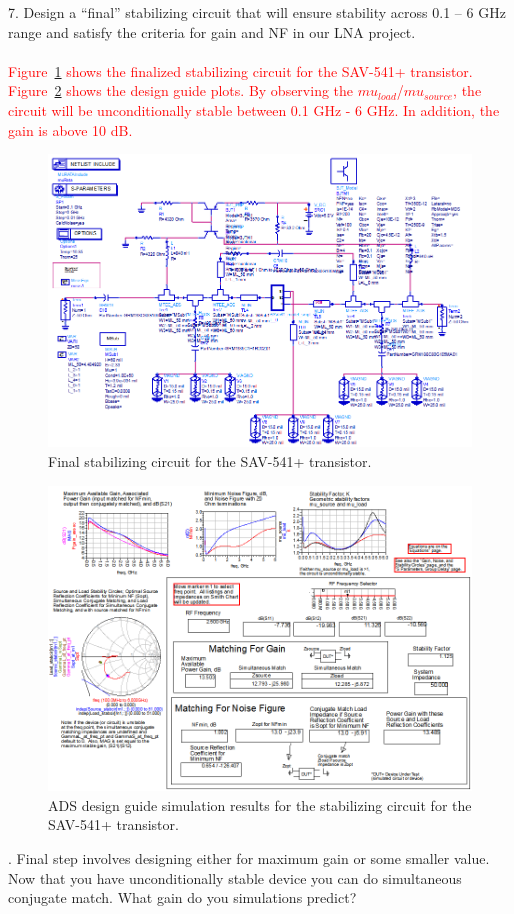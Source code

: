 \documentclass[conference]{IEEEtran}
\begin{document}
7. Design a “final” stabilizing circuit that will ensure stability across 0.1 – 6 GHz range and satisfy the criteria for gain and NF in our LNA project.\\\\
\textcolor{red}{Figure~\ref{fig:finalstabcircuit} shows the finalized stabilizing circuit for the SAV-541+ transistor.  Figure~\ref{fig:finalstabsimulation} shows the design guide plots.  By observing the $mu_{load}$/$mu_{source}$, the circuit will be unconditionally stable between 0.1 GHz - 6 GHz.  In addition, the gain is above 10 dB.}
\begin{figure}[!h]
\centering
\includegraphics[scale=0.35]{pics/FinalStabilizingCircuit.png}
\caption{Final stabilizing circuit for the SAV-541+ transistor.}
\label{fig:finalstabcircuit}
\end{figure}
\begin{figure}[!h]
\centering
\includegraphics[scale=0.35]{pics/FinalStabilizingSimulation.png}
\caption{ADS design guide simulation results for the stabilizing circuit for the SAV-541+ transistor.}
\label{fig:finalstabsimulation}
\end{figure}
. Final step involves designing either for maximum gain or some smaller value. Now that you have unconditionally stable device you can do simultaneous conjugate match. What gain do you simulations predict?
\end{document}
